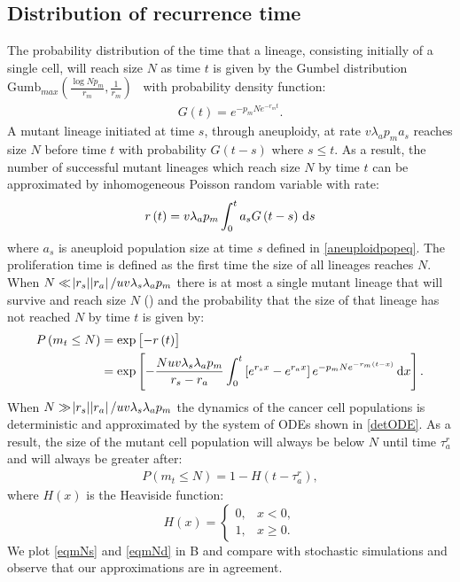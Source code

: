 \documentclass[12pt]{extarticle}
\renewcommand{\d}[1]{\ensuremath{\operatorname{d}\!{#1}}}
\renewcommand{\d}{{\rm d}}
\newcommand{\e}{e}
\renewcommand{\Delta}{r}
\begin{document}
\begin{appendices}
\section{Distribution of recurrence time}
The probability distribution of the time that a lineage, consisting initially of a single cell, will reach size $N$ as time $t$ is given by the Gumbel distribution $\text{Gumb}_{max}\left(\frac{\log Np_m}{\Delta_m},\frac{1}{\Delta_m}\right)$~\citep{avanzini2019cancer} with probability density function:
\begin{align*}
G\left(t\right)=\e^{-p_mN\e^{-\Delta_mt}}.
\end{align*}
A mutant lineage initiated at time $s$, through aneuploidy, at rate $v\lambda_ap_ma_s$ reaches size $N$ before time $t$ with probability $G\left(t-s\right)$ where $s\leq t$. As a result, the number of successful mutant lineages which reach size $N$ by time $t$ can be approximated by inhomogeneous Poisson random variable with rate:
\begin{align*}
r\left(t\right)=v\lambda_ap_m\int_0^t a_sG\left(t-s\right)\,\d s
\end{align*}
where $a_s$ is aneuploid population size at time $s$ defined in \cref{aneuploidpopeq}. The proliferation time is defined as the first time the size of all lineages reaches $N$. When $N\ll\abs{\Delta_s}\abs{\Delta_a}/uv\lambda_s\lambda_ap_m$ there is at most a single mutant lineage that will survive and reach size $N$ () and the probability that the size of that lineage has not reached $N$ by time $t$ is given by:
\begin{align}\nonumber
P\left(m_t\leq N\right)&=\exp\left[-r\left(t\right)\right]\\ \label{eqmNs}
&=\exp\left[-\frac{Nuv\lambda_s\lambda_ap_m}{\Delta_s-\Delta_a}\int_0^t\left[\e^{\Delta_sx}-\e^{\Delta_ax}\right]\e^{-p_mN\e^{-\Delta_m\left(t-x\right)}}\,\d x\right].
\end{align}
When $N\gg\abs{\Delta_s}\abs{\Delta_a}/uv\lambda_s\lambda_ap_m$ the dynamics of the cancer cell populations is deterministic and approximated by the system of ODEs shown in \cref{detODE}. As a result, the size of the mutant cell population will always be below $N$ until time $\tau_a^r$ and will always be greater after:
\begin{align}\label{eqmNd}
P\left(m_t\leq N\right)=1-H\left(t-\tau_a^r\right),
\end{align}
where $H(x)$ is the Heaviside function:
\begin{equation*}
H\left(x\right) = \begin{cases}
    0 ,&
  x<0 ,\\ 
  1 ,&
  x\geq0 .
  \end{cases}
\end{equation*}
We plot \cref{eqmNs} and \cref{eqmNd} in B and compare with stochastic simulations and observe that our approximations are in agreement. %


\end{appendices}
\end{document}
